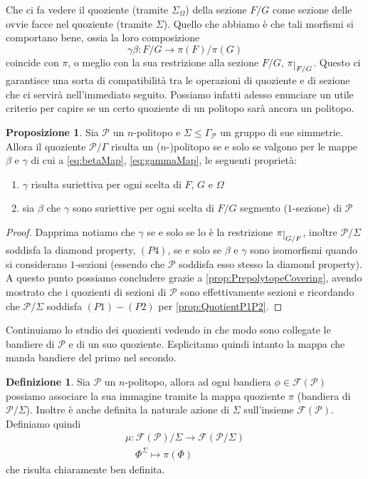 \documentclass[a4paper,12pt]{report}
\newcommand{\p}{\mathcal{P}}
\theoremstyle{plain}
\theoremstyle{definition}
\newtheorem{defin}[teo]{Definizione}
\newtheorem{prop}[teo]{Proposizione}
\newcommand\flag[1]{\mathcal{F}(#1)}
\def\restrict#1{\raise-.5ex\hbox{\ensuremath|}_{#1}}
\begin{document}
Che ci fa vedere il quoziente (tramite $\Sigma_\Omega$) della sezione $F/G$ come sezione delle ovvie facce nel quoziente (tramite $\Sigma$).
Quello che abbiamo \`e che tali morfismi si comportano bene, ossia la loro composizione
\begin{equation*}
\gamma\beta:F/G\longrightarrow\pi(F)/\pi(G)
\end{equation*}
coincide con $\pi$, o meglio con la sua restrizione alla sezione $F/G$, $\pi\restrict{F/G}$. Questo ci garantisce una sorta di compatibilit\`a tra
le operazioni di quoziente e di sezione che ci servir\`a nell'immediato seguito.
Possiamo infatti adesso enunciare un utile criterio per capire se un certo quoziente di un politopo sar\`a ancora un politopo.
\begin{prop}
\label{prop:QuotientIsPolitope}
Sia $\p$ un $n$-politopo e $\Sigma\leq\Gamma_\p$ un gruppo di sue simmetrie. Allora il quoziente $\p/\Gamma$ risulta un ($n$-)politopo se e solo se
valgono per le mappe $\beta$ e $\gamma$ di cui a \ref{eq:betaMap}, \ref{eq:gammaMap}, le seguenti propriet\`a:
\begin{enumerate}
\item$\gamma$ risulta suriettiva per ogni scelta di $F$, $G$ e $\Omega$\\
\item sia $\beta$ che $\gamma$ sono suriettive per ogni scelta di $F/G$ segmento ($1$-sezione) di $\p$
\end{enumerate}
\end{prop}
\begin{proof}
Dapprima notiamo che $\gamma$ se e solo se lo \`e la restrizione $\pi\restrict{G/F}$, inoltre $\p/\Sigma$ soddisfa la diamond property, $(P4)$, 
se e solo se $\beta$ e $\gamma$ sono isomorfismi quando si considerano $1$-sezioni (essendo che $\p$ soddisfa esso stesso la diamond property).
A questo punto possiamo concludere grazie a \ref{prop:PrepolytopeCovering}, avendo mostrato che i quozienti di sezioni di $\p$ sono effettivamente
sezioni e ricordando che $\p/\Sigma$ soddisfa $(P1)-(P2)$ per \ref{prop:QuotientP1P2}.
\end{proof}
Continuiamo lo studio dei quozienti vedendo in che modo sono collegate le bandiere di $\p$ e di un suo quoziente. Esplicitamo quindi intanto la mappa che
manda bandiere del primo nel secondo.
\begin{defin}
\label{def:mu}
Sia $\p$ un $n$-politopo, allora ad ogni bandiera $\phi\in\flag{\p}$ possiamo associare la sua immagine tramite la mappa quoziente $\pi$
(bandiera di $\p/\Sigma$). Inoltre \`e anche definita la naturale azione di $\Sigma$ sull'insieme $\flag{\p}$. Definiamo quindi
\begin{gather*}
\mu:\flag{\p}/\Sigma\longrightarrow\flag{\p/\Sigma}\\
\quad\Phi^\Sigma\longmapsto\pi(\Phi)
\end{gather*}
che risulta chiaramente ben definita.
\end{defin}
\end{document}

